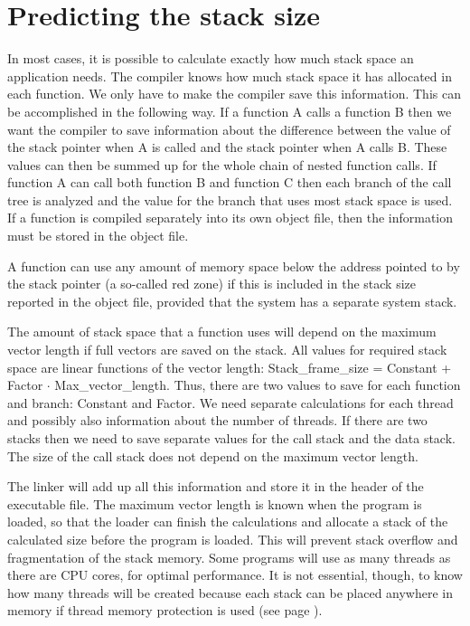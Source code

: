 \documentclass[forwardcom.tex]{subfiles}
\begin{document}
\section{Predicting the stack size} \label{predictingStackSize}
In most cases, it is possible to calculate exactly how much stack space an application needs. The compiler knows how much stack space it has allocated in each function. We only have to make the compiler save this information. This can be accomplished in the following way. If a function A calls a function B then we want the compiler to save information about the difference between the value of the stack pointer when A is called and the stack pointer when A calls B. These values can then be summed up for the whole chain of nested function calls. If function A can call both function B and function C then each branch of the call tree is analyzed and the value for the branch that uses most stack space is used. If a function is compiled separately into its own object file, then the information must be stored in the object file. 
\vspace{2mm}

A function can use any amount of memory space below the address pointed to by the stack pointer (a so-called red zone) if this is included in the stack size reported in the object file, provided that the system has a separate system stack. 
\vspace{2mm}

The amount of stack space that a function uses will depend on the maximum vector length if full vectors are saved on the stack. All values for required stack space are linear functions of the vector length: Stack\_frame\_size = Constant + Factor $\cdot$ Max\_vector\_length. Thus, there are two values to save for each function and branch: Constant and Factor. We need separate calculations for each thread and possibly also information about the number of threads. If there are two stacks then we need to save separate values for the call stack and the data stack. The size of the call stack does not depend on the maximum vector length. 
\vspace{2mm}

The linker will add up all this information and store it in the header of the executable file. The maximum vector length is known when the program is loaded, so that the loader can finish the calculations and allocate a stack of the calculated size before the program is loaded. This will prevent stack overflow and fragmentation of the stack memory. Some programs will use as many threads as there are CPU cores, for optimal performance. It is not essential, though, to know how many threads will be created because each stack can be placed anywhere in memory if thread memory protection is used (see page \pageref{threadMemoryProtection}). 
\vspace{2mm}
\end{document}
